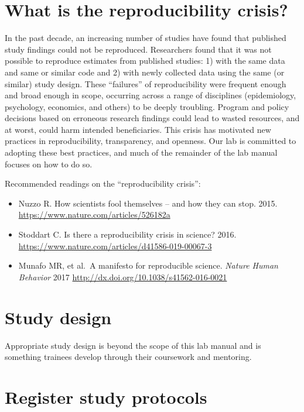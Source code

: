 \documentclass[
]{book}
\begin{document}
\hypertarget{what-is-the-reproducibility-crisis}{%
\section{What is the reproducibility crisis?}\label{what-is-the-reproducibility-crisis}}

In the past decade, an increasing number of studies have found that published study findings could not be reproduced. Researchers found that it was not possible to reproduce estimates from published studies: 1) with the same data and same or similar code and 2) with newly collected data using the same (or similar) study design. These ``failures'' of reproducibility were frequent enough and broad enough in scope, occurring across a range of disciplines (epidemiology, psychology, economics, and others) to be deeply troubling. Program and policy decisions based on erroneous research findings could lead to wasted resources, and at worst, could harm intended beneficiaries. This crisis has motivated new practices in reproducibility, transparency, and openness. Our lab is committed to adopting these best practices, and much of the remainder of the lab manual focuses on how to do so.

Recommended readings on the ``reproducibility crisis'':

\begin{itemize}
\item
  Nuzzo R. How scientists fool themselves -- and how they can stop. 2015. \href{}{https://www.nature.com/articles/526182a}
\item
  Stoddart C. Is there a reproducibility crisis in science? 2016. \url{https://www.nature.com/articles/d41586-019-00067-3}
\item
  Munafo MR, et al.~A manifesto for reproducible science. \emph{Nature Human Behavior} 2017 \url{http://dx.doi.org/10.1038/s41562-016-0021}
\end{itemize}

\hypertarget{study-design}{%
\section{Study design}\label{study-design}}

Appropriate study design is beyond the scope of this lab manual and is something trainees develop through their coursework and mentoring.

\hypertarget{register-study-protocols}{%
\section{Register study protocols}\label{register-study-protocols}}
\end{document}
